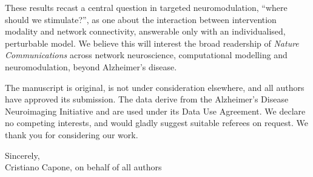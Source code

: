\documentclass[11pt]{article}
\begin{document}
These results recast a central question in targeted neuromodulation, ``where
should we stimulate?'', as one about the interaction between intervention modality
and network connectivity, answerable only with an individualised, perturbable
model. We believe this will interest the broad readership of \textit{Nature
Communications} across network neuroscience, computational modelling and
neuromodulation, beyond Alzheimer's disease.

The manuscript is original, is not under consideration elsewhere, and all authors
have approved its submission. The data derive from the Alzheimer's Disease
Neuroimaging Initiative and are used under its Data Use Agreement. We declare no
competing interests, and would gladly suggest suitable referees on request. We
thank you for considering our work.

\vspace{1em}
{\raggedright
Sincerely,\\[0.3em]
Cristiano Capone, on behalf of all authors\par}
\end{document}
